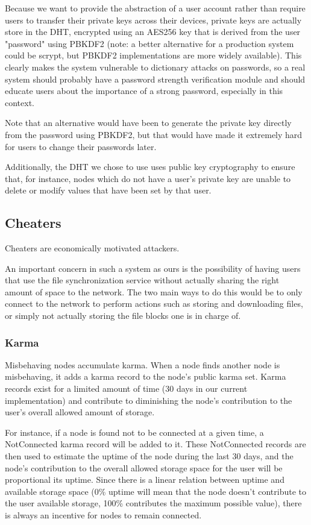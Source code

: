 \documentclass[11pt]{IEEEtran}
\begin{document}
Because we want to provide the abstraction of a user account rather than require users to transfer their private keys across their devices, private keys are actually store in the DHT, encrypted using an AES256 key that is derived from the user "password" using PBKDF2\cite{PBKDF2} (note: a better alternative for a production system could be scrypt\cite{scrypt}, but PBKDF2 implementations are more widely available). This clearly makes the system vulnerable to dictionary attacks on passwords, so a real system should probably have a password strength verification module and should educate users about the importance of a strong password, especially in this context.

Note that an alternative would have been to generate the private key directly from the password using PBKDF2, but that would have made it extremely hard for users to change their passwords later.

Additionally, the DHT we chose to use uses public key cryptography to ensure that, for instance, nodes which do not have a user's private key are unable to delete or modify values that have been set by that user. 

\subsection{Cheaters}

Cheaters are economically motivated attackers.

An important concern in such a system as ours is the possibility of having users that use the file synchronization service without actually sharing the right amount of space to the network. The two main ways to do this would be to only connect to the network to perform actions such as storing and downloading files, or simply not actually storing the file blocks one is in charge of. 

\subsubsection{\textbf{Karma}}

Misbehaving nodes accumulate karma. When a node finds another node is misbehaving, it adds a karma record to the node's public karma set. Karma records exist for a limited amount of time (30 days in our current implementation) and contribute to diminishing the node's contribution to the user's overall allowed amount of storage.

For instance, if a node is found not to be connected at a given time, a NotConnected karma record will be added to it. These NotConnected records are then used to estimate the uptime of the node during the last 30 days, and the node's contribution to the overall allowed storage space for the user will be proportional its uptime. Since there is a linear relation between uptime and available storage space (0\% uptime will mean that the node doesn't contribute to the user available storage, 100\% contributes the maximum possible value), there is always an incentive for nodes to remain connected.
\end{document}
